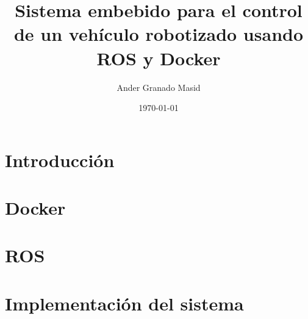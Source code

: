 \documentclass[a4paper,12pt,oneside]{scrbook}
\title{Sistema embebido para el control de un vehículo robotizado usando ROS y Docker}
\author{Ander Granado Masid}
\date{\today}
\begin{document}
\frontmatter %

\tableofcontents %
\listoffigures %


\mainmatter %
\part{Introducción}
	
	

\part{Docker}
	
	

\part{ROS}
	
	
	
\part{Implementación del sistema}
	


\backmatter



\end{document}
